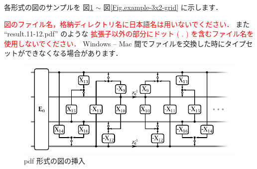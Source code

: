 \documentclass[dvipdfmx,report,disablejfam,nosetpagesize,12pt]{jsbook}
\begin{document}
各形式の図のサンプルを
図\ref{Fig.example-pdf} $\sim$ 図\ref{Fig.example-3x2-grid} に示します．

\textcolor{red}{図のファイル名，格納ディレクトリ名に日本語名は用いないでください．}
また
``result.11-12.pdf'' のような
\textcolor{red}{拡張子以外の部分にドット ( . ) を含むファイル名を使用しないでください．}
Windows -- Mac 間でファイルを交換した時にタイプセットができなくなる場合があります．

\begin{figure}[tp]
   \centering
   \includegraphics[width=.7\hsize]{figure/example-pdf.pdf}
   \caption{pdf 形式の図の挿入}
   \label{Fig.example-pdf}
\end{figure}
\end{document}
